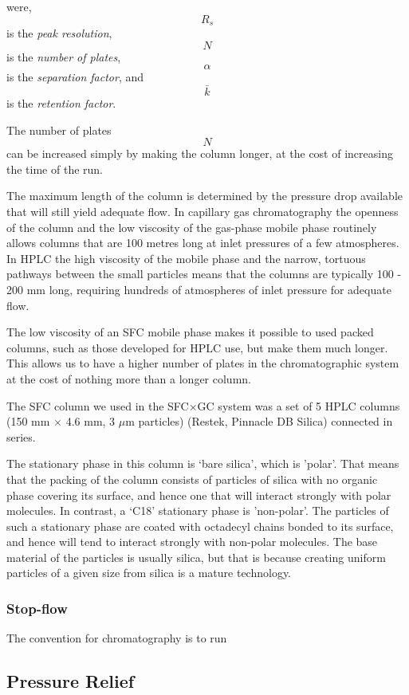 were, $$R_s$$ is the \textit{peak resolution}, $$N$$ is the \textit{number of plates}, $$\alpha$$ is the \textit{separation factor}, and $$\bar{k}$$ is the \textit{retention factor}.
 
The number of plates $$N$$ can be increased simply by making the column longer,
at the cost of increasing the time of the run.

The maximum length of the column is determined by the pressure drop available
that will still yield adequate flow. In capillary gas chromatography the
openness of the column and the low viscosity of the gas-phase mobile phase
routinely allows columns that are 100 metres long at inlet pressures of a few
atmospheres. In HPLC the high viscosity of the mobile phase and the narrow,
tortuous pathways between the small particles means that the columns are
typically 100 - 200 mm long, requiring hundreds of atmospheres of inlet pressure
for adequate flow.

The low viscosity of an SFC mobile phase makes it possible to used packed
columns, such as those developed for HPLC use, but make them much longer. This
allows us to have a higher number of plates in the chromatographic system at the
cost of nothing more than a longer column.

The SFC column we used in the SFC×GC system was a set of 5 HPLC columns (150 mm
$\times$ 4.6 mm, 3 $\mu$m particles) (Restek, Pinnacle DB Silica) connected in
series.

The stationary phase in this column is `bare silica', which is 'polar'. That
means that the packing of the column consists of particles of silica with no
organic phase covering its surface, and hence one that will interact strongly
with polar molecules. In contrast, a `C18' stationary phase is 'non-polar'. The
particles of such a stationary phase are coated with octadecyl chains bonded to
its surface, and hence will tend to interact strongly with non-polar molecules.
The base material of the particles is usually silica, but that is because
creating uniform particles of a given size from silica is a mature technology. 

\subsubsection{Stop-flow}

The convention for chromatography is to run

\subsection{Pressure Relief}

